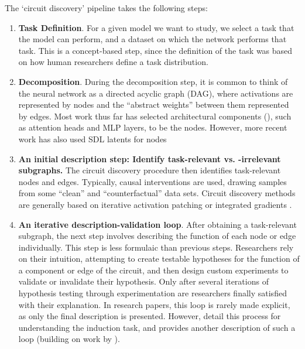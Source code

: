 The `circuit discovery' pipeline takes the following steps:

\begin{enumerate}

\item   \textbf{Task Definition}. For a given model we want to study, we select a task that the model can perform, and a dataset on which the network performs that task. This is a concept-based step, since the definition of the task was based on how human researchers define a task distribution.

\item   \textbf{Decomposition}. During the decomposition step, it is common to think of the neural network as a directed acyclic graph (DAG), where activations are represented by nodes and the “abstract weights” between them represented by edges. Most work thus far has selected architectural components (), such as attention heads and MLP layers, to be the nodes. However, more recent work has also used SDL latents for nodes \citep{marks2024sparsefeaturecircuitsdiscovering}

\item   \textbf{An initial description step: Identify task-relevant vs. -irrelevant subgraphs.} The circuit discovery procedure then identifies task-relevant nodes and edges. Typically, causal interventions are used, drawing samples from some “clean” and “counterfactual” data sets. Circuit discovery methods are generally based on iterative activation patching \citep{Wang_2022_Circuits,Chan_Garriga-alonso_Goldowsky-Dill_2022,lieberum2023doescircuitanalysisinterpretability} or integrated gradients \citep{marks2024sparsefeaturecircuitsdiscovering}.

\item   \textbf{An iterative description-validation loop}. After obtaining a task-relevant subgraph, the next step involves describing the function of each node or edge individually. This step is less formulaic than previous steps. Researchers rely on their intuition, attempting to create testable hypotheses for the function of a component or edge of the circuit, and then design custom experiments to validate or invalidate their hypothesis. Only after several iterations of hypothesis testing through experimentation are researchers finally satisfied with their explanation. In research papers, this loop is rarely made explicit, as only the final description is presented. However, \citet{Chan_2022_InductionHeads} detail this process for understanding the induction task, and \citet{nanda2023othello}provides another description of such a loop (building on work by \citet{li2024emergentworldrepresentationsexploring}).


\end{enumerate}
